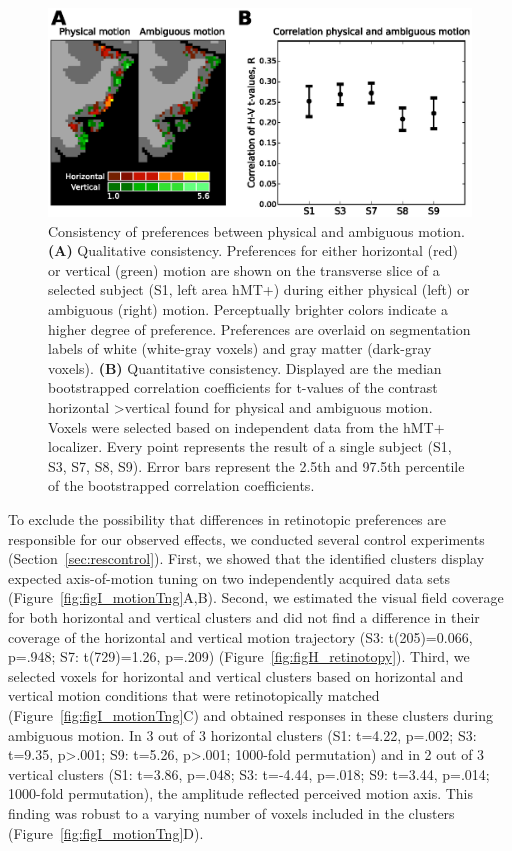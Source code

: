 \begin{figure}[htb!]
\centering
\includegraphics[width=\textwidth]{figures/chapter_03/fig3.eps}
\caption{Consistency of preferences between physical and ambiguous motion. \textbf{(A)} Qualitative consistency. Preferences for either horizontal (red) or vertical (green) motion are shown on the transverse slice of a selected subject (S1, left area hMT+) during either physical (left) or ambiguous (right) motion. Perceptually brighter colors indicate a higher degree of preference. Preferences are overlaid on segmentation labels of white (white-gray voxels) and gray matter (dark-gray voxels). \textbf{(B)} Quantitative consistency. Displayed are the median bootstrapped correlation coefficients for t-values of the contrast horizontal \textgreater vertical found for physical and ambiguous motion. Voxels were selected based on independent data from the hMT+ localizer. Every point represents the result of a single subject (S1, S3, S7, S8, S9). Error bars represent the 2.5th and 97.5th percentile of the bootstrapped correlation coefficients.}
\label{fig:consistency}
\end{figure}

To exclude the possibility that differences in retinotopic preferences are responsible for our observed effects, we conducted several control experiments (Section~\ref{sec:rescontrol}). First, we showed that the identified clusters display expected axis-of-motion tuning on two independently acquired data sets (Figure~\ref{fig:figI_motionTng}A,B). Second, we estimated the visual field coverage for both horizontal and vertical clusters and did not find a difference in their coverage of the horizontal and vertical motion trajectory (S3: t(205)=0.066, p=.948; S7: t(729)=1.26, p=.209) (Figure~\ref{fig:figH_retinotopy}). Third, we selected voxels for horizontal and vertical clusters based on horizontal and vertical motion conditions that were retinotopically matched (Figure~\ref{fig:figI_motionTng}C) and obtained responses in these clusters during ambiguous motion. In 3 out of 3 horizontal clusters (S1: t=4.22, p=.002; S3: t=9.35, p\textgreater.001; S9: t=5.26, p\textgreater.001; 1000-fold permutation) and in 2 out of 3 vertical clusters (S1: t=3.86, p=.048; S3: t=-4.44, p=.018; S9: t=3.44, p=.014; 1000-fold permutation), the amplitude reflected perceived motion axis. This finding was robust to a varying number of voxels included in the clusters (Figure~\ref{fig:figI_motionTng}D).

